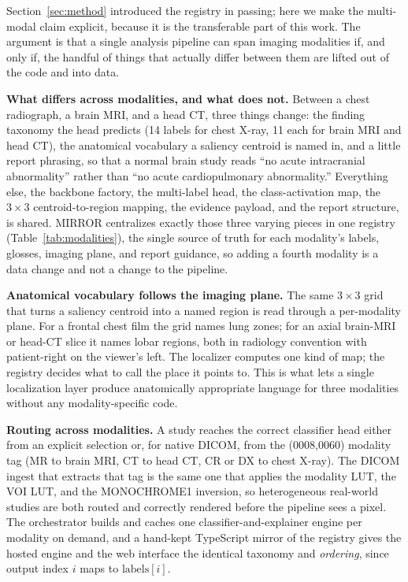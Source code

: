 \documentclass[conference]{IEEEtran}
\newcommand{\rih}[1]{\textbf{#1}\enspace\ignorespaces}
\begin{document}
Section~\ref{sec:method} introduced the registry in passing; here we make the
multi-modal claim explicit, because it is the transferable part of this work. The
argument is that a single analysis pipeline can span imaging modalities if, and only
if, the handful of things that actually differ between them are lifted out of the
code and into data.

\rih{What differs across modalities, and what does not.} Between a chest radiograph,
a brain MRI, and a head CT, three things change: the finding taxonomy the head
predicts (14 labels for chest X-ray, 11 each for brain MRI and head CT), the
anatomical vocabulary a saliency centroid is named in, and a little report phrasing,
so that a normal brain study reads ``no acute intracranial abnormality'' rather than
``no acute cardiopulmonary abnormality.'' Everything else, the backbone factory, the
multi-label head, the class-activation map, the $3\times3$ centroid-to-region
mapping, the evidence payload, and the report structure, is shared. MIRROR
centralizes exactly those three varying pieces in one registry
(Table~\ref{tab:modalities}), the single source of truth for each modality's labels,
glosses, imaging plane, and report guidance, so adding a fourth modality is a data
change and not a change to the pipeline.

\rih{Anatomical vocabulary follows the imaging plane.} The same $3\times3$ grid that
turns a saliency centroid into a named region is read through a per-modality plane.
For a frontal chest film the grid names lung zones; for an axial brain-MRI or
head-CT slice it names lobar regions, both in radiology convention with patient-right
on the viewer's left. The localizer computes one kind of map; the registry decides
what to call the place it points to. This is what lets a single localization layer
produce anatomically appropriate language for three modalities without any
modality-specific code.

\rih{Routing across modalities.} A study reaches the correct classifier head either
from an explicit selection or, for native DICOM, from the (0008,0060) modality tag
(MR to brain MRI, CT to head CT, CR or DX to chest X-ray). The DICOM ingest that
extracts that tag is the same one that applies the modality LUT, the VOI LUT, and
the MONOCHROME1 inversion, so heterogeneous real-world studies are both routed and
correctly rendered before the pipeline sees a pixel. The orchestrator builds and
caches one classifier-and-explainer engine per modality on demand, and a hand-kept
TypeScript mirror of the registry gives the hosted engine and the web interface the
identical taxonomy and \emph{ordering}, since output index $i$ maps to
$\text{labels}[i]$.
\end{document}
